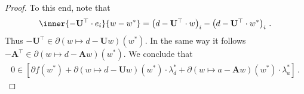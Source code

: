\begin{proof}
To this end, note that
\begin{gather}
  \inner
  {
  -
\mathbf{U}^\top
\cdot e_i
}
  {w-w^*}
  =
  \left( 
    d-
\mathbf{U}^\top
\cdot w
  \right)_i
  -
  \left( 
    d-
\mathbf{U}^\top\cdot w^*
  \right)_i
  \,.
\end{gather}
Thus
$
-
\mathbf{U}^\top
\in
    \partial
    \left( 
      w
      \mapsto
      d
      -
      \mathbf{U}w
    \right)
    (w^*)
$.
In the same way it follows
$
-
\mathbf{A}^\top
\in
    \partial
    \left( 
      w
      \mapsto
      d
      -
      \mathbf{A}w
    \right)
    (w^*)
$.
We conclude that
\begin{gather}
  \mathrm{0}
  \in
  [
  \partial
  f(w^*)
  +
    \partial
    \left( 
      w
      \mapsto
      d
      -
      \mathbf{U}w
    \right)
    (w^*)
    \cdot
    \lambda_d^*
    +
    \partial
    \left( 
      w
      \mapsto
      a
      -
      \mathbf{A}w
    \right)
    (w^*)
    \cdot
    \lambda_a^*
  ]
  \,.
\end{gather}


\end{proof}
